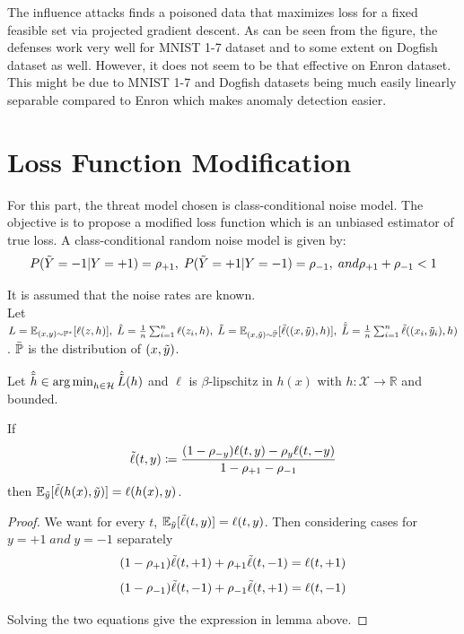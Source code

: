 \documentclass[11pt]{report}
\DeclareMathOperator*{\argmin}{arg\,min}
\begin{document}
The influence attacks finds a poisoned data that maximizes loss for a fixed feasible set via projected gradient descent. As can be seen from the figure, the defenses work very well for MNIST 1-7 dataset and to some extent on Dogfish dataset as well. However, it does not seem to be that effective on Enron dataset. This might be due to MNIST 1-7 and Dogfish datasets being much easily linearly separable compared to Enron which makes anomaly detection easier.

\section{Loss Function Modification}

For this part, the threat model chosen is class-conditional noise model. The objective is to propose a modified loss function which is an unbiased estimator of true loss\cite{NIPS2013_3871bd64}. A class-conditional random noise model is given by:
\[P(\Tilde{Y} = -1| Y = +1) = \rho_{+1},\; P(\Tilde{Y}=+1|Y=-1)=\rho_{-1},\; and \rho_{+1}+\rho_{-1}<1\]

\noindent It is assumed that the noise rates are known. \\ Let \(L=\mathbb{E}_{(x,y)\sim\mathbb{P}^*}[\ell(z,h)],\; \hat{L}=\frac{1}{n}\sum_{i=1}^n\ell(z_i,h),\; \Tilde{L}=\mathbb{E}_{(x,\Tilde{y})\sim\Bar{\mathbb{P}}}[\Tilde{\ell}((x,\Tilde{y}),h)],\; \hat{\Tilde{L}}=\frac{1}{n}\sum_{i=1}^n\Tilde{\ell}((x_i,\Tilde{y}_i),h)\). \(\Bar{\mathbb{P}}\) is the distribution of \((x,\Tilde{y})\).

\noindent Let \(\hat{\Tilde{h}} \in \argmin_{h\in \mathcal{H}}\hat{\Tilde{L}}(h)\) and \(\ell\) is \(\beta\)-lipschitz in \(h(x)\) with \(h:\mathcal{X}\rightarrow \mathbb{R}\) and bounded.

\begin{lemma}
    If \[\Tilde{\ell}(t,y) \coloneqq \frac{(1-\rho_{-y})\ell(t,y)-\rho_y\ell(t,-y)}{1-\rho_{+1}-\rho_{-1}}\]
    then \(\mathbb{E}_{\Tilde{y}}[\Tilde{\ell}(h(x),\Tilde{y})]=\ell(h(x),y)\).
\end{lemma}

\begin{proof}
    We want for every \(t\), \(\mathbb{E}_{\Tilde{y}}[\Tilde{\ell}(t,y)] = \ell(t,y)\). Then considering cases for \(y=+1\; and \; y=-1\) separately
    \[(1-\rho_{+1})\Tilde{\ell}(t,+1)+\rho_{+1}\Tilde{\ell}(t,-1)=\ell(t,+1)\]
    \[(1-\rho_{-1})\Tilde{\ell}(t,-1)+\rho_{-1}\Tilde{\ell}(t,+1)=\ell(t,-1)\]

    Solving the two equations give the expression in lemma above.
\end{proof}
\end{document}
